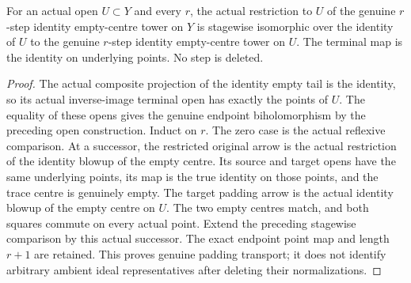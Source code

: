 \begin{theorem}
\label{hir:sharp-actual-identity-empty-padding-open-restriction}
\leanok
For an actual open $U\subset Y$ and every $r$, the actual restriction to $U$
of the genuine $r$-step identity empty-centre tower on $Y$ is stagewise
isomorphic over the identity of $U$ to the genuine $r$-step identity
empty-centre tower on $U$. The terminal map is the identity on underlying
points. No step is deleted.
\end{theorem}
\begin{proof}
The actual composite projection of the identity empty tail is the identity,
so its actual inverse-image terminal open has exactly the points of $U$.
The equality of these opens gives the genuine endpoint biholomorphism by the
preceding open construction. Induct on $r$. The zero case is the actual
reflexive comparison. At a successor, the restricted original arrow is the
actual restriction of the identity blowup of the empty centre. Its source
and target opens have the same underlying points, its map is the true
identity on those points, and the trace centre is genuinely empty.
The target padding arrow is the actual identity blowup of the empty centre
on $U$. The two empty centres match, and both squares commute on every
actual point. Extend the preceding stagewise comparison by this actual
successor. The exact endpoint point map and length $r+1$ are retained.
This proves genuine padding transport; it does not identify arbitrary
ambient ideal representatives after deleting their normalizations.
\end{proof}
